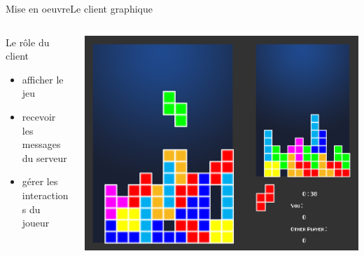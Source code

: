 \documentclass[french]{beamer}
\begin{document}
		\begin{frame}{Mise en oeuvre}{Le client graphique}
			\begin{columns}
				\begin{column}{0.35\textwidth}
					\begin{block}{Le rôle du client}
						\begin{itemize}
							\item afficher le jeu
							\item recevoir les messages du serveur
							\item gérer les interactions du joueur
						\end{itemize}
					\end{block}
				\end{column}

				\begin{column}{0.45\textwidth}
					\includegraphics[scale=0.175]{img/vouitris.png}
				\end{column}

			\end{columns}
		\end{frame}
\end{document}
